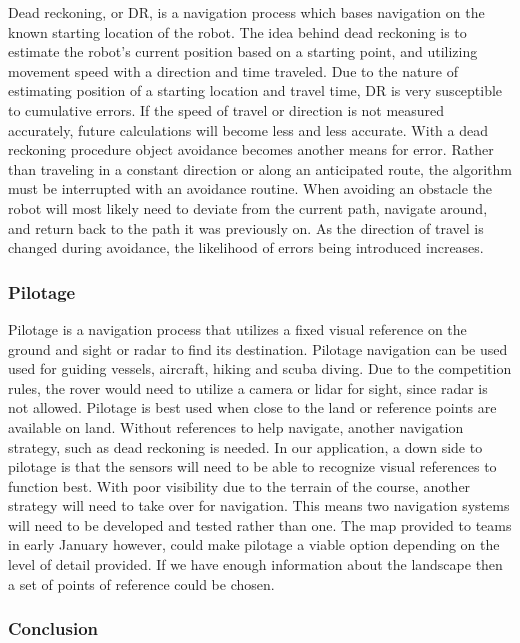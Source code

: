 \documentclass[10pt, oneside,onecolumn]{IEEEtran}
\begin{document}
	Dead reckoning, or DR, is a navigation process which bases navigation on the known starting location of the robot. The idea behind dead reckoning is to estimate the robot's current position based on a starting point, and utilizing movement speed with a direction and time traveled. Due to the nature of estimating position of a starting location and travel time, DR is very susceptible to cumulative errors. If the speed of travel or direction is not measured accurately, future calculations will become less and less accurate.
	With a dead reckoning procedure object avoidance becomes another means for error. Rather than traveling in a constant direction or along an anticipated route, the algorithm must be interrupted with an avoidance routine. When avoiding an obstacle the robot will most likely need to deviate from the current path, navigate around, and return back to the path it was previously on. As the direction of travel is changed during avoidance, the likelihood of errors being introduced increases. 

\subsubsection{Pilotage}

	Pilotage is a navigation process that utilizes a fixed visual reference on the ground and sight or radar to find its destination. Pilotage navigation can be used used for guiding vessels, aircraft, hiking and scuba diving. Due to the competition rules, the rover would need to utilize a camera or lidar for sight, since radar is not allowed. Pilotage is best used when close to the land or reference points are available on land. Without references to help navigate, another navigation strategy, such as dead reckoning is needed. In our application, a down side to pilotage is that the sensors will need to be able to recognize visual references to function best. With poor visibility due to the terrain of the course, another strategy will need to take over for navigation. This means two navigation systems will need to be developed and tested rather than one. The map provided to teams in early January however, could make pilotage a viable option depending on the level of detail provided. If we have enough information about the landscape then a set of points of reference could be chosen. 

\subsubsection{Conclusion}
\end{document}
